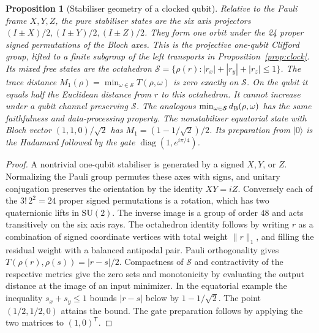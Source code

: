 \documentclass[aps,pra,onecolumn,superscriptaddress,nofootinbib,10pt]{revtex4-2}
\newtheorem{proposition}[theorem]{Proposition}
\theoremstyle{definition}
\theoremstyle{remark}
\begin{document}
\begin{proposition}[Stabiliser geometry of a clocked qubit]\label{ob:stabiliser}
Relative to the Pauli frame \(X,Y,Z\), the pure stabiliser states are the
six axis projectors \((I\pm X)/2,(I\pm Y)/2,(I\pm Z)/2\).
They form one orbit under the 24 proper signed permutations of the
Bloch axes. This is the projective one-qubit Clifford group, lifted
to a finite subgroup of the left transports in
Proposition~\ref{prop:clock}. Its mixed free states are the octahedron
\(\mathcal S=\{\rho(r): |r_x|+|r_y|+|r_z|\le1\}\).
The trace distance \(M_1(\rho)=\min_{\omega\in\mathcal S}T(\rho,\omega)\)
is zero exactly on \(\mathcal S\). On the qubit it equals half the
Euclidean distance from \(r\) to this octahedron. It cannot increase
under a qubit channel preserving \(\mathcal S\). The analogous
\(\min_{\omega\in\mathcal S}d_{\rm B}(\rho,\omega)\) has the same
faithfulness and data-processing property. The nonstabiliser equatorial
state with Bloch vector \((1,1,0)/\sqrt2\) has
\(M_1=(1-1/\sqrt2)/2\). Its preparation from \(|0\rangle\) is the
Hadamard followed by the gate \(\operatorname{diag}(1,e^{i\pi/4})\).
\end{proposition}
\begin{proof}
A nontrivial one-qubit stabiliser is generated by a signed \(X,Y\), or
\(Z\). Normalizing the Pauli group permutes these axes with signs,
and unitary conjugation preserves the orientation by the identity
\(XY=iZ\). Conversely each of the \(3!\,2^2=24\) proper signed
permutations is a rotation, which has two quaternionic lifts in
\(\mathrm{SU}(2)\). The inverse image is a group of order \(48\)
and acts transitively on the six axis rays. The octahedron identity
follows by writing \(r\) as a combination of signed coordinate
vertices with total weight \(\|r\|_1\), and filling the residual
weight with a balanced antipodal pair. Pauli orthogonality gives
\(T(\rho(r),\rho(s))=|r-s|/2\). Compactness of \(\mathcal S\) and
contractivity of the respective metrics give the zero sets and
monotonicity by evaluating the output distance at the image of an
input minimizer. In the equatorial example the inequality \(s_x+s_y
\le1\) bounds \(|r-s|\) below by \(1-1/\sqrt2\). The point
\((1/2,1/2,0)\) attains the bound. The gate preparation follows by
applying the two matrices to \((1,0)^{\mathsf T}\).
\end{proof}
\end{document}
